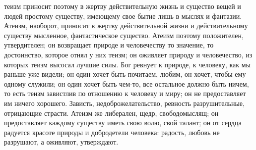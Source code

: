 \documentclass[12pt]{article}
\begin{document}
теизм приносит поэтому в жертву действительную жизнь и существо вещей и людей простому существу, имеющему свое бытие лишь в мыслях и фантазии. Атеизм, наоборот, приносит в жертву действительной жизни и действительному существу мысленное, фантастическое существо. Атеизм поэтому положителен, утвердителен; он возвращает природе и человечеству то значение, то достоинство, которое отнял у них теизм; он оживляет природу и человечество, из которых теизм высосал лучшие силы. Бог ревнует к природе, к человеку, как мы раньше уже видели; он один хочет быть почитаем, любим, он хочет, чтобы ему одному служили; он один хочет быть чем-то, все остальное должно быть ничем, то есть теизм завистлив по отношению к человеку и миру; он не предоставляет им ничего хорошего. Зависть, недоброжелательство, ревность разрушительные, отрицающие страсти. Атеизм же либерален, щедр, свободомыслящ; он предоставляет каждому существу иметь свою волю, свой талант; он от сердца радуется красоте природы и добродетели человека: радость, любовь не разрушают, а оживляют, утверждают. 
\end{document}
